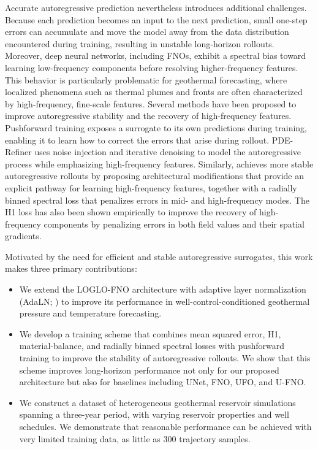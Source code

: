 \documentclass[pdflatex,sn-mathphys-ay]{sn-jnl}
\begin{document}
Accurate autoregressive prediction nevertheless introduces additional challenges. Because
each prediction becomes an input to the next prediction, small one-step errors can accumulate
and move the model away from the data distribution encountered during training, resulting in
unstable long-horizon rollouts. Moreover, deep neural networks, including FNOs, exhibit a
spectral bias toward learning low-frequency components before resolving higher-frequency
features. This behavior is particularly problematic for geothermal forecasting, where
localized phenomena such as thermal plumes and fronts are often characterized by
high-frequency, fine-scale features. Several methods have been proposed to improve autoregressive stability and the recovery of
high-frequency features. Pushforward training exposes a surrogate to its own predictions
during training, enabling it to learn how to correct the errors that arise during rollout.
PDE-Refiner uses noise injection and iterative denoising to model the autoregressive process
while emphasizing high-frequency features. Similarly, \citet{loglofno} achieves more stable autoregressive rollouts by proposing architectural
modifications that provide an explicit pathway for learning high-frequency features, together
with a radially binned spectral loss that penalizes errors in mid- and high-frequency
modes. The H1 loss has also been shown empirically to improve the recovery of high-frequency components by
penalizing errors in both field values and their spatial gradients.

Motivated by the need for efficient and stable autoregressive surrogates, this work makes
three primary contributions:
\begin{itemize}
  \item We extend the LOGLO-FNO architecture with adaptive layer normalization (AdaLN;
  \citep{adaln, film}) to improve its performance in well-control-conditioned geothermal
  pressure and temperature forecasting.
  \item We develop a training scheme that combines mean squared error, H1,
  material-balance, and radially binned spectral losses with pushforward training to
  improve the stability of autoregressive rollouts. We show that this scheme improves
  long-horizon performance not only for our proposed architecture but also for baselines
  including UNet, FNO, UFO, and U-FNO.
  \item We construct a dataset of heterogeneous geothermal reservoir simulations spanning a
  three-year period, with varying reservoir properties and well schedules. We demonstrate
  that reasonable performance can be achieved with very limited training data, as little as
  300 trajectory samples.
\end{itemize}
\end{document}
